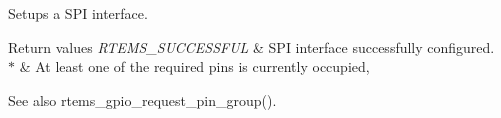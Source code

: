 Setups a S\+PI interface. 


\begin{DoxyRetVals}{Return values}
{\em R\+T\+E\+M\+S\+\_\+\+S\+U\+C\+C\+E\+S\+S\+F\+UL} & S\+PI interface successfully configured. \\
\hline
{\em $\ast$} & At least one of the required pins is currently occupied, \\
\hline
\end{DoxyRetVals}
\begin{DoxySeeAlso}{See also}
rtems\+\_\+gpio\+\_\+request\+\_\+pin\+\_\+group(). 
\end{DoxySeeAlso}
